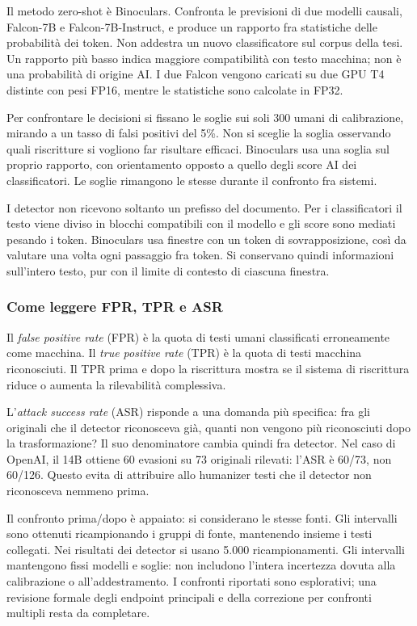 \documentclass[11pt,a4paper]{article}
\begin{document}
Il metodo zero-shot è Binoculars. Confronta le previsioni di due modelli causali, Falcon-7B e Falcon-7B-Instruct, e produce un rapporto fra statistiche delle probabilità dei token. Non addestra un nuovo classificatore sul corpus della tesi. Un rapporto più basso indica maggiore compatibilità con testo macchina; non è una probabilità di origine AI. I due Falcon vengono caricati su due GPU T4 distinte con pesi FP16, mentre le statistiche sono calcolate in FP32.

Per confrontare le decisioni si fissano le soglie sui soli 300 umani di calibrazione, mirando a un tasso di falsi positivi del 5\%. Non si sceglie la soglia osservando quali riscritture si vogliono far risultare efficaci. Binoculars usa una soglia sul proprio rapporto, con orientamento opposto a quello degli score AI dei classificatori. Le soglie rimangono le stesse durante il confronto fra sistemi.

I detector non ricevono soltanto un prefisso del documento. Per i classificatori il testo viene diviso in blocchi compatibili con il modello e gli score sono mediati pesando i token. Binoculars usa finestre con un token di sovrapposizione, così da valutare una volta ogni passaggio fra token. Si conservano quindi informazioni sull'intero testo, pur con il limite di contesto di ciascuna finestra.

\subsubsection{Come leggere FPR, TPR e ASR}\label{come-leggere-fpr-tpr-e-asr}

Il \emph{false positive rate} (FPR) è la quota di testi umani classificati erroneamente come macchina. Il \emph{true positive rate} (TPR) è la quota di testi macchina riconosciuti. Il TPR prima e dopo la riscrittura mostra se il sistema di riscrittura riduce o aumenta la rilevabilità complessiva.

L'\emph{attack success rate} (ASR) risponde a una domanda più specifica: fra gli originali che il detector riconosceva già, quanti non vengono più riconosciuti dopo la trasformazione? Il suo denominatore cambia quindi fra detector. Nel caso di OpenAI, il 14B ottiene 60 evasioni su 73 originali rilevati: l'ASR è 60/73, non 60/126. Questo evita di attribuire allo humanizer testi che il detector non riconosceva nemmeno prima.

Il confronto prima/dopo è appaiato: si considerano le stesse fonti. Gli intervalli sono ottenuti ricampionando i gruppi di fonte, mantenendo insieme i testi collegati. Nei risultati dei detector si usano 5.000 ricampionamenti. Gli intervalli mantengono fissi modelli e soglie: non includono l'intera incertezza dovuta alla calibrazione o all'addestramento. I confronti riportati sono esplorativi; una revisione formale degli endpoint principali e della correzione per confronti multipli resta da completare.
\end{document}
